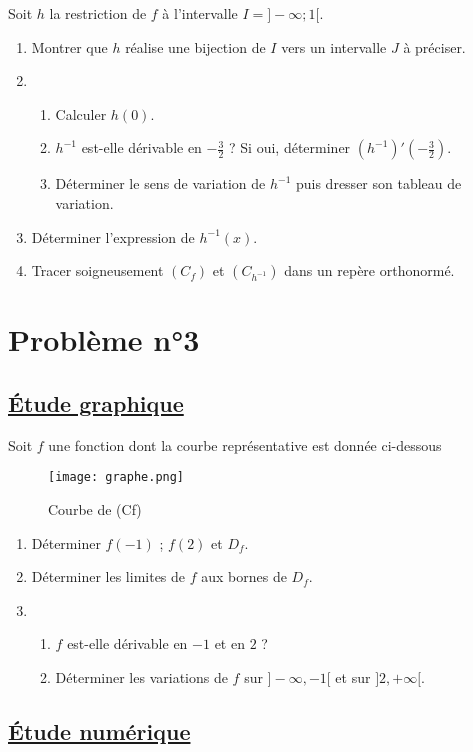\documentclass[12pt]{article}
\begin{document}
Soit $h$ la restriction de $f$ à l’intervalle $I = ]-\infty; 1[$.
\begin{enumerate}
    \item Montrer que $h$ réalise une bijection de $I$ vers un intervalle $J$ à préciser.
    \item 
    \begin{enumerate}
        \item Calculer $h(0)$.
        \item $h^{-1}$ est-elle dérivable en $-\frac{3}{2}$ ? Si oui, déterminer $(h^{-1})'\left(-\frac{3}{2}\right)$.
        \item Déterminer le sens de variation de $h^{-1}$ puis dresser son tableau de variation.
    \end{enumerate}
    \item Déterminer l’expression de $h^{-1}(x)$.
    \item Tracer soigneusement $(C_f)$ et $(C_{h^{-1}})$ dans un repère orthonormé.
\end{enumerate}

\section*{Problème n°3}

\subsection*{\underline{Étude graphique}}
Soit $f$ une fonction dont la courbe représentative est donnée ci-dessous
\begin{figure}[H]%
\centering
\texttt{[image: graphe.png]}
\caption{Courbe de (Cf)}
\label{fig:monimage}
\end{figure}
\begin{enumerate}
    \item Déterminer $f(-1)$ ; $f(2)$ et $D_f$.
    \item Déterminer les limites de $f$ aux bornes de $D_f$.
    \item 
    \begin{enumerate}
        \item $f$ est-elle dérivable en $-1$ et en $2$ ?
        \item Déterminer les variations de $f$ sur $]-\infty, -1[$ et sur $]2, +\infty[$.
    \end{enumerate}
\end{enumerate}

\subsection*{\underline{Étude numérique}}
\end{document}
